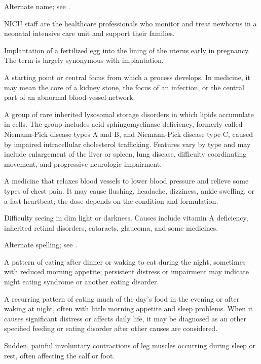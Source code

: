  Alternate name; see .

 NICU staff are the healthcare professionals who monitor and treat newborns in a neonatal intensive care unit and support their families.

 Implantation of a fertilized egg into the lining of the uterus early in pregnancy. The term is largely synonymous with implantation.

 A starting point or central focus from which a process develops. In medicine, it may mean the core of a kidney stone, the focus of an infection, or the central part of an abnormal blood-vessel network.

 A group of rare inherited lysosomal storage disorders in which lipids accumulate in cells. The group includes acid sphingomyelinase deficiency, formerly called Niemann-Pick disease types A and B, and Niemann-Pick disease type C, caused by impaired intracellular cholesterol trafficking. Features vary by type and may include enlargement of the liver or spleen, lung disease, difficulty coordinating movement, and progressive neurologic impairment.

 A medicine that relaxes blood vessels to lower blood pressure and relieve some types of chest pain. It may cause flushing, headache, dizziness, ankle swelling, or a fast heartbeat; the dose depends on the condition and formulation.

 Difficulty seeing in dim light or darkness. Causes include vitamin A deficiency, inherited retinal disorders, cataracts, glaucoma, and some medicines.

 Alternate spelling; see .

 A pattern of eating after dinner or waking to eat during the night, sometimes with reduced morning appetite; persistent distress or impairment may indicate night eating syndrome or another eating disorder.

 A recurring pattern of eating much of the day’s food in the evening or after waking at night, often with little morning appetite and sleep problems. When it causes significant distress or affects daily life, it may be diagnosed as an other specified feeding or eating disorder after other causes are considered.

 Sudden, painful involuntary contractions of leg muscles occurring during sleep or rest, often affecting the calf or foot.

